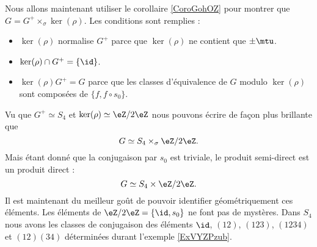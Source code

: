 Nous allons maintenant utiliser le corollaire \ref{CoroGohOZ} pour montrer que \( G=G^+\times_{\sigma}\ker(\rho)\). Les conditions sont remplies :
\begin{itemize}
    \item \( \ker(\rho)\) normalise \( G^+\) parce que \( \ker(\rho)\) ne contient que \( \pm\mtu\).
    \item \( \ker(\rho)\cap G^+=\{ \id \}\).
    \item \( \ker(\rho)G^+=G\) parce que les classes d'équivalence de \( G\) modulo \( \ker(\rho)\) sont composées de \( \{ f,f\circ s_0 \}\).
\end{itemize}
Vu que \( G^+\simeq S_4\) et \( \ker(\rho)\simeq \eZ/2\eZ\) nous pouvons écrire de façon plus brillante que
\begin{equation}
    G\simeq S_4\times_{\sigma}\eZ/2\eZ.
\end{equation}
Mais étant donné que la conjugaison par \( s_0\) est triviale, le produit semi-direct est un produit direct :
\begin{equation}
    G\simeq S_4\times\eZ/2\eZ.
\end{equation}
Il est maintenant du meilleur goût de pouvoir identifier géométriquement ces éléments. Les éléments de \( \eZ/2\eZ=\{ \id,s_0 \}\) ne font pas de mystères. Dans \( S_4\) nous avons les classes de conjugaison des éléments \( \id\), \( (12)\), \( (123)\), \( (1234)\) et \( (12)(34)\) déterminées durant l'exemple \ref{ExVYZPzub}.
